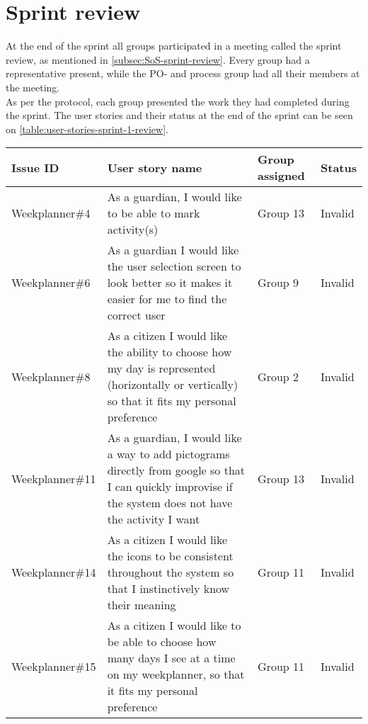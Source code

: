 \section{Sprint review}
At the end of the sprint all groups participated in a meeting called the sprint review, as mentioned in \autoref{subsec:SoS-sprint-review}.
Every group had a representative present, while the PO- and process group had all their members at the meeting.
\\
As per the protocol, each group presented the work they had completed during the sprint. The user stories and their status at the end of the sprint can be seen on \autoref{table:user-stories-sprint-1-review}.

\begin{table}[H]
    \begin{tabular}{|p{2.8cm}|p{7cm}|p{2cm}|p{1.5cm}|}
    \hline
    Issue ID        & User story name                                                                                                                                                          & Group assigned  & Status     \\ \hline
    Weekplanner\#4  & As a guardian, I would like to be able to mark activity(s)                                                                                                               & Group 13        & Invalid    \\ \hline
    Weekplanner\#6  & As a guardian I would like the user selection screen to look better so it makes it easier for me to find the correct user                                                & Group 9         & Invalid    \\ \hline
    Weekplanner\#8  & As a citizen I would like the ability to choose how my day is represented (horizontally or vertically) so that it fits my personal preference                            & Group 2         & Invalid    \\ \hline
    Weekplanner\#11 & As a guardian, I would like a way to add pictograms directly from google so that I can quickly improvise if the system does not have the activity I want                 & Group 13        & Invalid    \\ \hline
    Weekplanner\#14 & As a citizen I would like the icons to be consistent throughout the system so that I instinctively know their meaning                                                    & Group 11        & Invalid    \\ \hline
    Weekplanner\#15 & As a citizen I would like to be able to choose how many days I see at a time on my weekplanner, so that it fits my personal preference                                   & Group 11        & Invalid    \\ \hline

\end{tabular}
\end{table}
